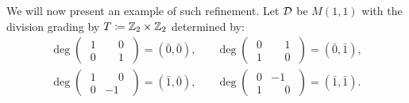 
We will now present an example of such refinement. 
Let $\mathcal{D}$ be $M(1,1)$ with the division grading by $T \coloneqq \mathbb{Z}_2 \times \mathbb{Z}_2$ determined by:
\begin{align*}
    \deg \begin{pmatrix}
        \phantom{.}1 & \phantom{-}0\phantom{.}\\
        \phantom{.}0 & \phantom{-}1\phantom{.}
    \end{pmatrix} = (\bar 0, \bar 0),\quad & \deg \begin{pmatrix}
        \phantom{.}0 & \phantom{-}1\phantom{.} \\
        \phantom{.}1 & \phantom{-}0\phantom{.}
    \end{pmatrix} = (\bar 0, \bar 1),\\
    \deg \begin{pmatrix}
        \phantom{.}1 & \phantom{-}0\phantom{.}\\
        \phantom{.}0 & -1\phantom{.}
    \end{pmatrix} = (\bar 1, \bar 0),\quad &
    \deg \begin{pmatrix}
        \phantom{.}0 & -1\phantom{.} \\
        \phantom{.}1 & \phantom{-}0\phantom{.}
    \end{pmatrix} = (\bar 1, \bar 1).
\end{align*}
%
%
